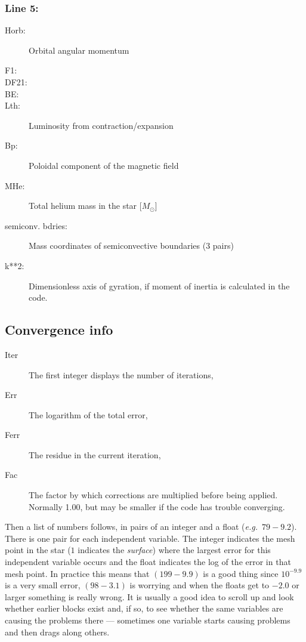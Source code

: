 \subsubsection*{Line 5:}
\begin{description}

\item[Horb:] Orbital angular momentum
\item[F1:]
\item[DF21:]
\item[BE:]
\item[Lth:] Luminosity from contraction/expansion
\item[Bp:] Poloidal component of the magnetic field
\item[MHe:] Total helium mass in the star [$M_\odot$]
\item[semiconv. bdries:] Mass coordinates of semiconvective boundaries (3 pairs)
\item[k**2:] Dimensionless axis of gyration, if moment of inertia is calculated in the code.
\end{description}




\subsection{Convergence info}

\begin{description}
\item[Iter] The first integer displays the number of iterations,
\item[Err] The logarithm of the total error,
\item[Ferr] The residue in the current iteration,
\item[Fac] The factor by which corrections are multiplied before being applied. Normally 1.00, 
  but may be smaller if the code has trouble converging.
\end{description}

\noindent
Then a list of numbers follows, in pairs of an integer and a float (\emph{e.g.}\ $79-9.2$). There is one 
pair for each independent variable. The integer indicates the mesh point in the star ($1$ indicates the \textit{surface})
where the largest error for this independent variable occurs and the float indicates the log of the error 
in that mesh point.  In practice this means that $(199-9.9)$ is a good thing since $10^{-9.9}$ is a 
very small error, $(98-3.1)$ is worrying and when the floats get to $-2.0$ or larger something is 
really wrong.
It is usually a good idea to scroll up and look whether earlier blocks exist and, if so, to see whether 
the same variables are causing the problems there --- sometimes one variable starts causing problems and 
then drags along others.



